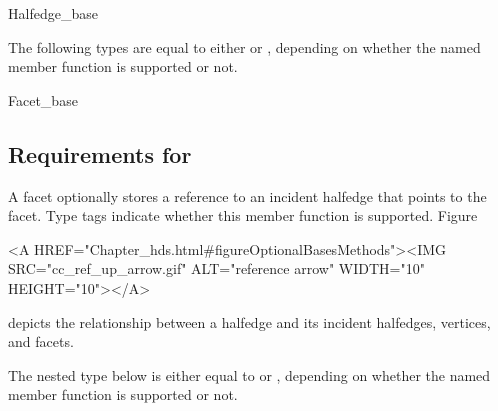 \begin{ccClass}{Halfedge_base}

The following types are equal to either  or
, depending on whether the named member function is
supported or not.

\ccGlue
{}
\ccGlue
{}

\end{ccClass}

\begin{ccClass}{Facet_base}
\subsection{Requirements for \protect{}}
\label{sectionHdsFacetBase}


\ccDefinition

A facet optionally stores a reference to an incident halfedge that
points to the facet. Type tags indicate whether this member function
is supported.  
Figure~\ccTexHtml{\ref{figureOptionalBasesMethods}}{}\begin{ccHtmlOnly}
  <A HREF="Chapter_hds.html#figureOptionalBasesMethods"><IMG 
  SRC="cc_ref_up_arrow.gif" ALT="reference arrow" WIDTH="10" HEIGHT="10"></A>
\end{ccHtmlOnly}
depicts the relationship between a halfedge and its incident
halfedges, vertices, and facets.



\ccCreation

\ccGlue
{}

\ccOperations

\ccGlue
{}




The nested type below is either equal to  or
, depending on whether the named member function is
supported or not. 


\end{ccClass}


